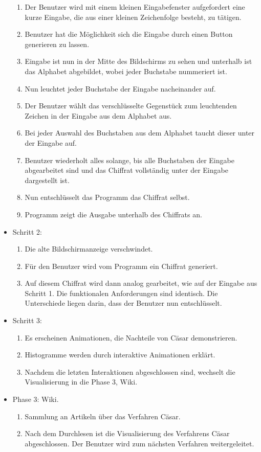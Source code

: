 \documentclass{article}
\begin{document}
\begin{itemize}[label={}]
	\begin{enumerate}
	 \item Der Benutzer wird mit einem kleinen Eingabefenster aufgefordert eine kurze Eingabe, die aus einer kleinen Zeichenfolge besteht, zu tätigen.
	 \item Benutzer hat die Möglichkeit sich die Eingabe durch einen Button generieren zu lassen.
	 \item Eingabe ist nun in der Mitte des Bildschirms zu sehen und unterhalb ist das Alphabet abgebildet, wobei jeder Buchstabe nummeriert ist.     
	 \item Nun leuchtet jeder Buchstabe der Eingabe nacheinander auf.
	 \item Der Benutzer wählt das verschlüsselte Gegenstück zum leuchtenden Zeichen in der Eingabe aus dem Alphabet aus. 
	 \item Bei jeder Auswahl des Buchstaben aus dem Alphabet taucht dieser unter der Eingabe auf.
	 \item[] Benutzer wiederholt alles solange, bis alle Buchstaben der Eingabe abgearbeitet sind und das Chiffrat vollständig unter der Eingabe dargestellt ist.
	 \item Nun entschlüsselt das Programm das Chiffrat selbst.
	 \item Programm zeigt die Ausgabe unterhalb des Chiffrats an.
	\end{enumerate}

 \item Schritt 2:

	\begin{enumerate}
	 \item Die alte Bildschirmanzeige verschwindet.
	 \item Für den Benutzer wird vom Programm ein Chiffrat generiert. 
	 \item[] Auf diesem Chiffrat wird dann analog gearbeitet, wie auf der Eingabe aus Schritt 1. Die funktionalen Anforderungen sind identisch. Die Unterschiede liegen darin, dass der Benutzer nun entschlüsselt.
	\end{enumerate}

 \item Schritt 3:
	\begin{enumerate}
	 \item Es erscheinen Animationen, die Nachteile von Cäsar demonstrieren.
	 \item Histogramme werden durch interaktive Animationen erklärt.
	 \item Nachdem die letzten Interaktionen abgeschlossen sind, wechselt die Visualisierung in die Phase 3, Wiki.
	\end{enumerate}

 \item Phase 3: Wiki.

	\begin{enumerate}
	 \item Sammlung an Artikeln über das Verfahren Cäsar.
	 \item Nach dem Durchlesen ist die Visualisierung des Verfahrens Cäsar abgeschlossen. Der Benutzer wird zum nächsten Verfahren weitergeleitet.
 	\end{enumerate}

\end{itemize}
\end{document}
